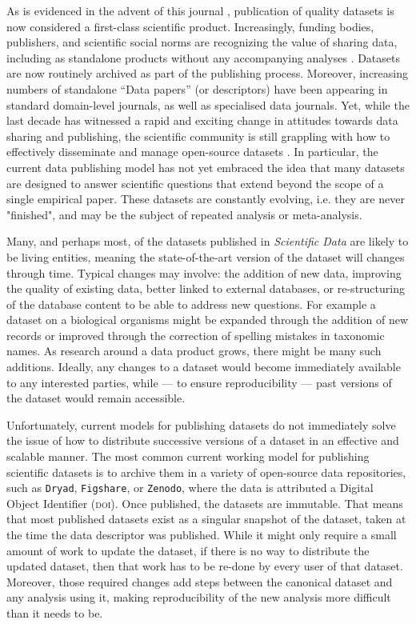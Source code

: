 \documentclass[a4paper,11pt]{article}
\begin{document}
As is evidenced in the advent of this journal \citep{Editorial-2014}, publication of quality datasets is now considered a first-class scientific product. Increasingly, funding bodies, publishers, and scientific social norms are recognizing the value of sharing data, including as standalone products without any accompanying analyses \citep[e.g.][]{Whitlock-2011,Fairbairn-2011,Piwowar-2011,VanNoorden-2013,Gibney-2013}. Datasets are now routinely archived as part of the publishing process. Moreover, increasing numbers of standalone ``Data papers'' (or descriptors) have been appearing in standard domain-level journals, as well as specialised data journals. Yet, while the last decade has witnessed a rapid and exciting change in attitudes towards data sharing and publishing, the scientific community is still grappling with how to effectively disseminate and manage open-source datasets \citep{Whitlock-2011, Goodman-2014, Lowndes-2017,Perkel-2016,VanNoorden-2013, Kratz-2015}. In particular, the current data publishing model has not yet embraced the idea that many  datasets are designed to answer scientific questions that extend beyond the scope of a single empirical paper.  These datasets are constantly evolving, i.e. they are never "finished", and may be the subject of repeated analysis or meta-analysis.

Many, and perhaps most, of the datasets published in \emph{Scientific Data} are likely to be living entities, meaning the state-of-the-art version of the dataset will changes through time. Typical changes may involve: the addition of new data, improving the quality of existing data, better linked to external databases, or re-structuring of the database content to be able to address new questions. For example a dataset on a biological organisms might be expanded through the addition of new records or improved through the correction of spelling mistakes in taxonomic names. As research around a data product grows, there might be many such additions. Ideally, any changes to a dataset would become immediately available to any interested parties, while --- to ensure reproducibility --- past versions of the dataset would remain accessible.

Unfortunately, current models for publishing datasets do not immediately solve the issue of how to distribute successive versions of a dataset in an effective and scalable manner. The most common current working model for publishing scientific datasets is to archive them in a variety of open-source data repositories, such as \texttt{Dryad}, \texttt{Figshare}, or \texttt{Zenodo}, where the data is attributed a Digital Object Identifier (\textsc{doi}). Once published, the datasets are immutable. That means that most published datasets exist as a singular snapshot of the dataset, taken at the time the data descriptor was published. While it might only require a small amount of work to update the dataset, if there is no way to distribute the updated dataset, then that work has to be re-done by every user of that dataset. Moreover, those required changes add steps between the canonical dataset and any analysis using it, making reproducibility of the new analysis more difficult than it needs to be.
\end{document}

